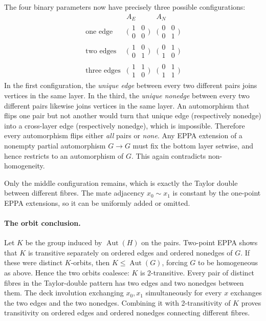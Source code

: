 \documentclass[11pt,a4paper]{article}
\begin{document}
The four binary parameters now have precisely
three possible configurations:
\[
\begin{array}{c|cc}
  &A_E&A_N\\ \hline
  \text{one edge}&
  \bigl(\begin{smallmatrix}1&0\\0&0\end{smallmatrix}\bigr)&
  \bigl(\begin{smallmatrix}0&0\\0&1\end{smallmatrix}\bigr)\\[2pt]
  \text{two edges}&
  \bigl(\begin{smallmatrix}1&0\\0&1\end{smallmatrix}\bigr)&
  \bigl(\begin{smallmatrix}0&1\\1&0\end{smallmatrix}\bigr)\\[2pt]
  \text{three edges}&
  \bigl(\begin{smallmatrix}1&1\\1&0\end{smallmatrix}\bigr)&
  \bigl(\begin{smallmatrix}0&1\\1&1\end{smallmatrix}\bigr)
\end{array}
\]
In the first configuration, the \emph{unique
edge} between every two different pairs joins
vertices in the same layer. In the third,
the \emph{unique nonedge} between every two
different pairs likewise joins vertices in
the same layer. An automorphism that flips
one pair but not another would turn that
unique edge (respectively nonedge) into a
cross-layer edge (respectively nonedge),
which is impossible. Therefore every
automorphism flips either \emph{all} pairs
or \emph{none}. Any EPPA extension of a
nonempty partial automorphism \(G\to G\)
must fix the bottom layer setwise, and
hence restricts to an automorphism of \(G\).
This again contradicts non-homogeneity.

Only the middle configuration remains,
which is exactly the Taylor double between
different fibres. The mate adjacency
\(x_0\sim x_1\) is constant by the one-point
EPPA extensions, so it can be uniformly
added or omitted.

\paragraph{The orbit conclusion.}
Let \(K\) be the group induced by
\(\operatorname{Aut}(H)\) on the pairs.
Two-point EPPA shows that \(K\) is
transitive separately on ordered edges and
ordered nonedges of \(G\). If these were
distinct \(K\)-orbits, then \(K\le
\operatorname{Aut}(G)\), forcing \(G\)
to be homogeneous as above. Hence the
two orbits coalesce: \(K\) is 2-transitive.
Every pair of distinct fibres in the
Taylor-double pattern has two edges
and two nonedges between them. The
deck involution exchanging \(x_0,x_1\)
simultaneously for every \(x\) exchanges
the two edges and the two nonedges.
Combining it with 2-transitivity of \(K\)
proves transitivity on ordered edges and
ordered nonedges connecting different fibres.
\end{document}
